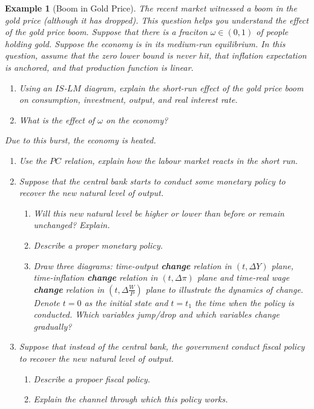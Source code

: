 \documentclass[12pt]{article}
\newtheorem{example}{Example}
\begin{document}
\begin{example}[Boom in Gold Price]
  The recent market witnessed a boom in the gold price (although it has dropped). This question helps you understand the effect of the gold price boom. Suppose that there is a fraciton $\omega \in (0,1)$ of people holding gold. Suppose the economy is in its medium-run equilibrium. In this question, assume that the zero lower bound is never hit, that inflation expectation is anchored, and that production function is linear.
  \begin{enumerate}[label=(\arabic*)]
    \item Using an $IS$-$LM$ diagram, explain the short-run effect of the gold price boom on consumption, investment, output, and real interest rate. 
    \vspace{80pt}
    \item What is the effect of $\omega$ on the economy?
  \end{enumerate}
  \newpage
  Due to this burst, the economy is heated.
  \begin{enumerate}[label=(\arabic*),resume] 
    \item Use the $PC$ relation, explain how the labour market reacts in the short run. 
    \vspace{80pt}
    \item Suppose that the central bank starts to conduct some monetary policy to recover the new natural level of output.
    \begin{enumerate}[label=\alph*.]
      \item Will this new natural level be higher or lower than before or remain unchanged? Explain.
      \vspace{80pt}
      \item Describe a proper monetary policy.
      \vspace{80pt}
      \item Draw three diagrams: time-output \textbf{change} relation in $(t, \Delta Y)$ plane, time-inflation \textbf{change}  relation in $(t, \Delta \pi)$ plane and time-real wage \textbf{change}  relation in $(t, \Delta \frac{W}{P})$ plane to illustrate the dynamics of change. Denote $t=0$ as the initial state and $t=t_1$ the time when the policy is conducted. Which variables jump/drop and which variables change gradually?
    \end{enumerate}
    \vspace{120pt}
    \newpage
    \item Suppose that instead of the central bank, the government conduct fiscal policy to recover the new natural level of output. 
    \begin{enumerate}
      \item Describe a propoer fiscal policy.
      \vspace{80pt}
      \item Explain the channel through which this policy works.
      \vspace{80pt}
    \end{enumerate}
  \end{enumerate} 
\end{example}
\end{document}
